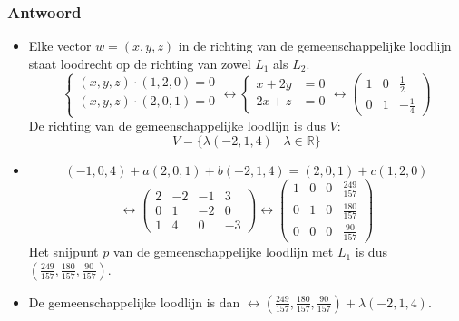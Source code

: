 \documentclass[main.tex]{subfiles}
\begin{document}
\subsubsection{Antwoord}
\begin{itemize}
\item Elke vector $w=(x,y,z)$ in de richting van de gemeenschappelijke loodlijn staat loodrecht op de richting van zowel $L_{1}$ als $L_{2}$.
  \[
  \left\{
    \begin{array}{cc}
      (x,y,z) \cdot (1,2,0) = 0\\
      (x,y,z) \cdot (2,0,1) = 0\\
    \end{array}
  \right. 
  \longleftrightarrow
  \left\{
    \begin{array}{cc}
      x+2y &= 0\\
      2x+z &= 0\\
    \end{array}
  \right. 
  \longleftrightarrow
  \begin{pmatrix}
    1 & 0 & \frac{1}{2}\\
    0 & 1 & -\frac{1}{4}
  \end{pmatrix}
  \]
  De richting van de gemeenschappelijke loodlijn is dus $V$:
  \[ V = \{ \lambda(-2,1,4)  \mid \lambda \in \mathbb{R} \} \]
\item 
  \[ (-1,0,4) + a (2,0,1) + b (-2,1,4) = (2,0,1) + c(1,2,0) \]
  \[
  \longleftrightarrow
  \begin{pmatrix}
    2 & -2 & -1 & 3\\
    0 & 1 & -2 & 0\\
    1 & 4 & 0 & -3
  \end{pmatrix}
  \longleftrightarrow
  \begin{pmatrix}
    1 & 0 & 0 & \frac{249}{157}\\
    0 & 1 & 0 & \frac{180}{157}\\
    0 & 0 & 0 & \frac{90}{157}
  \end{pmatrix}
  \]
  Het snijpunt $p$ van de gemeenschappelijke loodlijn met $L_{1}$ is dus $\left(\frac{249}{157},\frac{180}{157},\frac{90}{157}\right)$.
\item De gemeenschappelijke loodlijn is dan $\leftrightarrow \left(\frac{249}{157},\frac{180}{157},\frac{90}{157}\right) + \lambda (-2,1,4)$.
\end{itemize}
\end{document}
